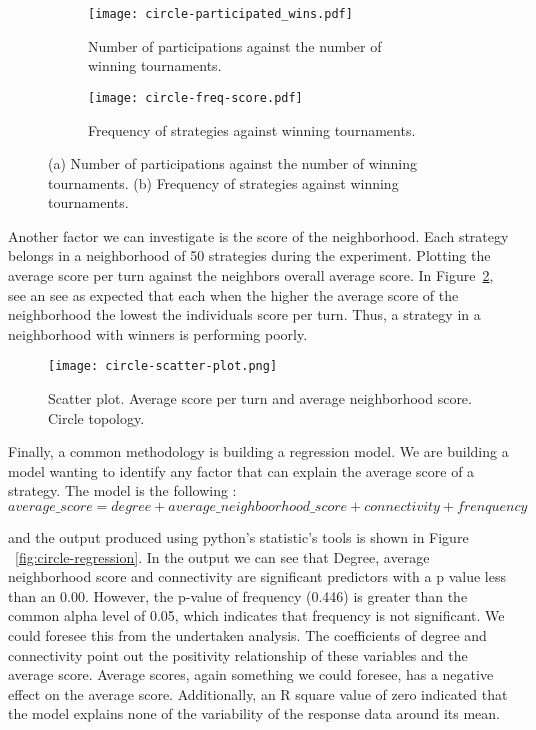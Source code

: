 \begin{figure}[h!]
\hspace*{-4cm}
    \begin{subfigure}[t]{1.4\textwidth}
    \centering
        \texttt{[image: circle-participated\_wins.pdf]}
    \caption{Number of participations against the number of winning tournaments.}
    \end{subfigure}
\hfill
\hspace*{-4cm}
    \begin{subfigure}[t]{1.4\textwidth}\centering
    \centering
        \texttt{[image: circle-freq-score.pdf]}
    \caption{Frequency of strategies against winning tournaments.}
    \end{subfigure}
\caption{(a) Number of participations against the number of winning tournaments.
         (b) Frequency of strategies against winning tournaments.}
\label{fig:circle_part-wins}
\end{figure}

\newpage

Another factor we can investigate is the score of the neighborhood. Each strategy
belongs in a neighborhood of 50 strategies during the experiment. Plotting
the average score per turn against the neighbors overall average score. In
Figure~\ref{fig:circle-scatter-plot}, see an see as expected that each when the
higher the average score of the neighborhood the lowest the individuals score
per turn. Thus, a strategy in a neighborhood with winners is performing poorly.

\begin{figure}[h!]
\centering
    \texttt{[image: circle-scatter-plot.png]}
    \caption{Scatter plot. Average score per turn and average neighborhood score.
             Circle topology.}
    \label{fig:circle-scatter-plot}
\end{figure}

Finally, a common methodology is building a regression model. We are building
a model wanting to identify any factor that can explain the average score of a
strategy. The model is the following :
\begin{equation}\label{regmodel}
average\_score = degree + average\_neighboorhood\_score + connectivity + frenquency
\end{equation}

and the output produced using python's statistic's tools is shown in Figure
~\ref{fig:circle-regression}. In the output we can see that Degree, average
neighborhood score and connectivity
are significant predictors with a p value less than an 0.00. However, the p-value
of frequency (0.446) is greater than the common alpha level of 0.05, which
indicates that frequency is not significant. We could foresee this from the undertaken
analysis. The coefficients of degree and connectivity point out the positivity
relationship of these variables and the average score. Average scores, again
something we could foresee, has a negative effect on the average score.
Additionally, an R square value of zero indicated that the model explains none of
the variability of the response data around its mean.

